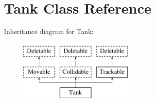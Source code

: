 \hypertarget{class_tank}{\section{Tank Class Reference}
\label{class_tank}
}
Inheritance diagram for Tank\+:\begin{figure}[H]
\begin{center}
\leavevmode
\includegraphics[height=3.000000cm]{class_tank}
\end{center}
\end{figure}
